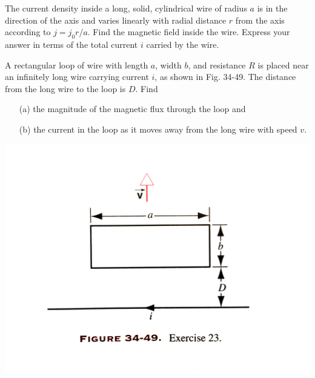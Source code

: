 \documentclass[12pt,letterpaper,boxed,cm]{hmcpset}
\begin{document}


\begin{problem}[33-P13*]
The current density inside a long, solid, cylindrical wire of radius $a$ is in the direction of the axis and varies linearly with radial distance $r$ from the axis according to $j = j_0r/a$. Find the magnetic field inside the wire. Express your answer in terms of the total current $i$ carried by the wire.	
\end{problem}
\begin{solution}
\end{solution}
\newpage


\begin{problem}[34-E23]
A rectangular loop of wire with length $a$, width $b$, and resistance $R$ is placed near an infinitely long wire carrying current $i$, as shown in Fig. 34-49. The distance from the long wire to the loop is $D$. Find
\begin{enumerate}
	\item[(a)] the magnitude of the magnetic flux through the loop and 
	\item[(b)] the current in the loop as it moves away from the long wire with speed $v$.
\end{enumerate}
\begin{center}
	\includegraphics[scale=0.1]{01.jpeg}	
\end{center}
\end{problem}
\begin{solution}
\end{solution}
\newpage
\end{document}
